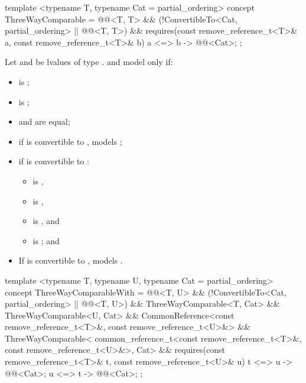 \begin{codeblock}
template <typename T, typename Cat = partial_ordering>
  concept ThreeWayComparable =
    @@<T, T> &&
    (!ConvertibleTo<Cat, partial_ordering> || @@<T, T>) &&
    requires(const remove_reference_t<T>& a, const remove_reference_t<T>& b) {
      { a <=> b } -> @@<Cat>;
    };
\end{codeblock}

\pnum
Let  and  be lvalues
of type .
 and 
model  only if:
\begin{itemize}
\item
   is ;
\item
   is ;
\item
   and  are equal;
\item
  if  is convertible to ,  models
  ;
\item
  if  is convertible to :
  \begin{itemize}
  \item
     is ,
  \item
     is ,
  \item
     is , and
  \item
     is ; and
  \end{itemize}
\item
  If  is convertible to ,  models
  .
\end{itemize}

\begin{codeblock}
template <typename T, typename U, typename Cat = partial_ordering>
  concept ThreeWayComparableWith =
    @@<T, U> &&
    (!ConvertibleTo<Cat, partial_ordering> || @@<T, U>) &&
    ThreeWayComparable<T, Cat> &&
    ThreeWayComparable<U, Cat> &&
    CommonReference<const remove_reference_t<T>&, const remove_reference_t<U>&> &&
    ThreeWayComparable<
      common_reference_t<const remove_reference_t<T>&, const remove_reference_t<U>&>, Cat> &&
    requires(const remove_reference_t<T>& t, const remove_reference_t<U>& u) {
      { t <=> u } -> @@<Cat>;
      { u <=> t } -> @@<Cat>;
    };
\end{codeblock}

